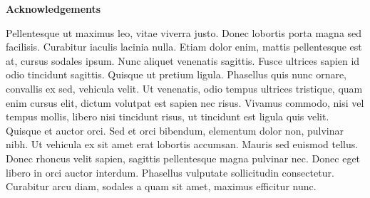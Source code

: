
\phantom{}
\begin{center}
\textbf{\Large Acknowledgements}
\end{center}
Pellentesque ut maximus leo, vitae viverra justo. Donec lobortis porta magna sed facilisis. Curabitur iaculis lacinia nulla. Etiam dolor enim, mattis pellentesque est at, cursus sodales ipsum. Nunc aliquet venenatis sagittis. Fusce ultrices sapien id odio tincidunt sagittis. Quisque ut pretium ligula. Phasellus quis nunc ornare, convallis ex sed, vehicula velit. Ut venenatis, odio tempus ultrices tristique, quam enim cursus elit, dictum volutpat est sapien nec risus. Vivamus commodo, nisi vel tempus mollis, libero nisi tincidunt risus, ut tincidunt est ligula quis velit. Quisque et auctor orci. Sed et orci bibendum, elementum dolor non, pulvinar nibh. Ut vehicula ex sit amet erat lobortis accumsan. Mauris sed euismod tellus. Donec rhoncus velit sapien, sagittis pellentesque magna pulvinar nec. Donec eget libero in orci auctor interdum. Phasellus vulputate sollicitudin consectetur. Curabitur arcu diam, sodales a quam sit amet, maximus efficitur nunc. \newpage
{}
\setcounter{page}{1}
